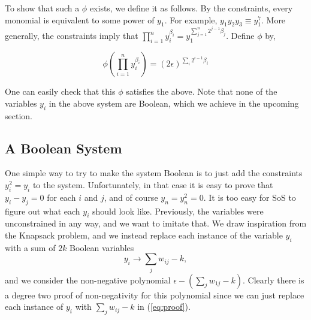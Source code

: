 \documentclass[a4paper,UKenglish]{lipics-v2016}
\begin{document}
To show that such a $\phi$ exists, we define it as follows. By the constraints, every monomial is equivalent to some power of $y_1$. For example, $y_1y_2y_3 \equiv y_1^7$.  More generally, the constraints imply that $\prod_{i = 1}^n y_i^{\beta_i} = y_1^{\sum_{j = 1}^n 2^{j-1} \beta_j}$.  Define $\phi$ by,

\[\phi\left( \prod_{i = 1}^n y_i^{\beta_i}\right) = (2\epsilon)^{\sum_{i} 2^{i-1} \beta_i } \]

One can easily check that this $\phi$ satisfies the above. Note that none of the variables $y_i$ in the above system are Boolean, which we achieve in the upcoming section.
 
\subsection{A Boolean System}
One simple way to try to make the system Boolean is to just add the constraints $y_i^2 = y_i$ to the system. Unfortunately, in that case it is easy to prove that $y_i - y_j = 0$ for each $i$ and $j$, and of course $y_n = y_n^2 = 0$. It is too easy for SoS to figure out what each $y_i$ should look like. Previously, the variables were unconstrained in any way, and we want to imitate that. We draw inspiration from the Knapsack problem, and we instead replace each instance of the variable $y_i$ with a sum of $2k$ Boolean variables 
\[y_i \rightarrow \sum_j w_{ij} - k,\] 
and we consider the non-negative polynomial $\epsilon - (\sum_j w_{1j} - k)$. Clearly there is a degree two proof of non-negativity for this polynomial since we can just replace each instance of $y_i$ with $\sum_j w_{ij} - k$ in (\ref{eq:proof}). 
\end{document}
